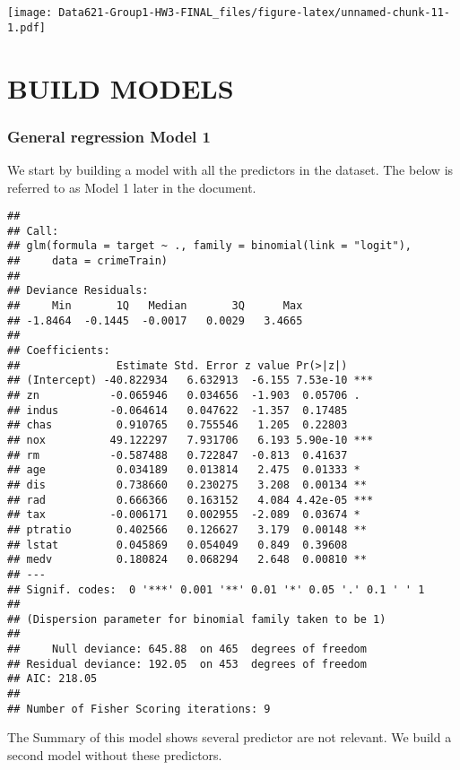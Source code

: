 \documentclass[
]{article}
\begin{document}
\texttt{[image: Data621-Group1-HW3-FINAL\_files/figure-latex/unnamed-chunk-11-1.pdf]}

\hypertarget{build-models}{%
\section{BUILD MODELS}\label{build-models}}

\hypertarget{general-regression-model-1}{%
\subsubsection{General regression Model
1}\label{general-regression-model-1}}

We start by building a model with all the predictors in the dataset. The
below is referred to as Model 1 later in the document.

\begin{verbatim}
## 
## Call:
## glm(formula = target ~ ., family = binomial(link = "logit"), 
##     data = crimeTrain)
## 
## Deviance Residuals: 
##     Min       1Q   Median       3Q      Max  
## -1.8464  -0.1445  -0.0017   0.0029   3.4665  
## 
## Coefficients:
##               Estimate Std. Error z value Pr(>|z|)    
## (Intercept) -40.822934   6.632913  -6.155 7.53e-10 ***
## zn           -0.065946   0.034656  -1.903  0.05706 .  
## indus        -0.064614   0.047622  -1.357  0.17485    
## chas          0.910765   0.755546   1.205  0.22803    
## nox          49.122297   7.931706   6.193 5.90e-10 ***
## rm           -0.587488   0.722847  -0.813  0.41637    
## age           0.034189   0.013814   2.475  0.01333 *  
## dis           0.738660   0.230275   3.208  0.00134 ** 
## rad           0.666366   0.163152   4.084 4.42e-05 ***
## tax          -0.006171   0.002955  -2.089  0.03674 *  
## ptratio       0.402566   0.126627   3.179  0.00148 ** 
## lstat         0.045869   0.054049   0.849  0.39608    
## medv          0.180824   0.068294   2.648  0.00810 ** 
## ---
## Signif. codes:  0 '***' 0.001 '**' 0.01 '*' 0.05 '.' 0.1 ' ' 1
## 
## (Dispersion parameter for binomial family taken to be 1)
## 
##     Null deviance: 645.88  on 465  degrees of freedom
## Residual deviance: 192.05  on 453  degrees of freedom
## AIC: 218.05
## 
## Number of Fisher Scoring iterations: 9
\end{verbatim}

The Summary of this model shows several predictor are not relevant. We
build a second model without these predictors.
\end{document}
